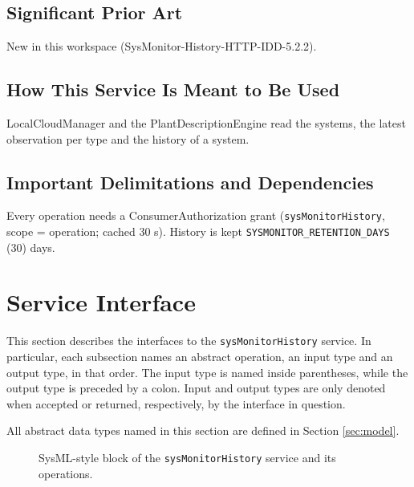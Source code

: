 \documentclass[a4paper]{arrowhead}
\begin{document}
\subsection{Significant Prior Art}

New in this workspace (SysMonitor-History-HTTP-IDD-5.2.2).

\subsection{How This Service Is Meant to Be Used}

LocalCloudManager and the Plant\allowbreak{}Description\allowbreak{}Engine read the systems, the latest observation per type and the history of a system.

\subsection{Important Delimitations and Dependencies}
\label{sec:delimitations}

Every operation needs a Consumer\allowbreak{}Authorization grant (\texttt{sysMonitorHistory}, scope = operation; cached 30 s). History is kept \texttt{SYSMONITOR\_\allowbreak{}RETENTION\_\allowbreak{}DAYS} (30) days.

\newpage

\section{Service Interface}
\label{sec:operations}

This section describes the interfaces to the \texttt{sysMonitorHistory} service.
In particular, each subsection names an abstract operation, an input type and an output type, in that order.
The input type is named inside parentheses, while the output type is preceded by a colon.
Input and output types are only denoted when accepted or returned, respectively, by the interface in question.

All abstract data types named in this section are defined in Section \ref{sec:model}.

\begin{figure}[ht!]
  \centering
  \caption{SysML-style block of the \texttt{sysMonitorHistory} service and its operations.}
  \label{fig:SD}
\end{figure}
\end{document}
